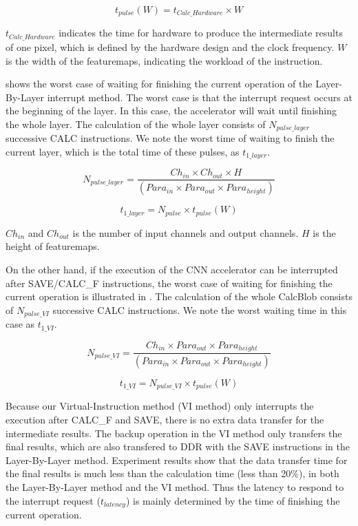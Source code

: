 \begin{equation}
	t_{pulse}(W) = t_{Calc\_Hardware} \times W
\end{equation}

$t_{Calc\_Hardware}$ indicates the time for hardware to produce the intermediate results of one pixel, which is defined by the hardware design and the clock frequency. $W$ is the width of the featuremaps, indicating the workload of the instruction.

 shows the worst case of waiting for finishing the current operation of the Layer-By-Layer interrupt method. The worst case is that the interrupt request occurs at the beginning of the layer. In this case, the accelerator will wait until finishing the whole layer. The calculation of the whole layer consists of $N_{pulse\_layer}$ successive CALC instructions. We note the worst time of waiting to finish the current layer, which is the total time of these pulses, as $t_{1\_layer}$.

\begin{equation}
	N_{pulse\_layer} = \frac{ Ch_{in} \times Ch_{out} \times H }{ (Para_{in} \times Para_{out} \times Para_{height}) } 
\end{equation}

\begin{equation}
t_{1\_layer} = N_{pulse} \times t_{pulse}(W)
\end{equation}

$Ch_{in}$ and $Ch_{out}$ is the number of input channels and output channels. $H$ is the height of featuremaps.

On the other hand, if the execution of the CNN accelerator can be interrupted after SAVE/CALC\_F instructions, the worst case of waiting for finishing the current operation is illustrated in . The calculation of the whole CalcBlob consists of $N_{pulse\_VI}$ successive CALC instructions. We note the worst waiting time in this case as $t_{1\_VI}$.

\begin{equation}
	N_{pulse\_VI} = \frac{ Ch_{in} \times Para_{out} \times Para_{height} }{ (Para_{in} \times Para_{out} \times Para_{height}) } 
\end{equation}

\begin{equation}
t_{1\_VI} = N_{pulse\_VI} \times t_{pulse}(W)
\end{equation}


Because our Virtual-Instruction method (VI method) only interrupts the execution after CALC\_F and SAVE, there is no extra data transfer for the intermediate results. The backup operation in the VI method only transfers the final results, which are also transfered to DDR with the SAVE instructions in the Layer-By-Layer method. Experiment results show that the data transfer time for the final results is much less than the calculation time (less than 20\%), in both the Layer-By-Layer method and the VI method. Thus the latency to respond to the interrupt request ($t_{latency}$) is mainly determined by the time of finishing the current operation.

